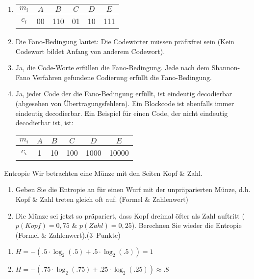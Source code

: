 \documentclass{article}
\begin{document}
\begin{solution}
  \begin{enumerate}
    \item
          \begin{tabular}{c|ccccc}
            $m_i$ & $A$ & $B$ & $C$ & $D$ & $E$ \\
            \hline
            $c_i$ & 00  & 110 & 01  & 10  & 111 \\
          \end{tabular}
    \item Die Fano-Bedingung lautet: Die Codewörter müssen präfixfrei sein (Kein Codewort bildet Anfang von anderem Codewort).
    \item Ja, die Code-Worte erfüllen die Fano-Bedingung. Jede nach dem Shannon-Fano Verfahren gefundene Codierung erfüllt die Fano-Bedingung.
    \item Ja, jeder Code der die Fano-Bedingung erfüllt, ist eindeutig decodierbar (abgesehen von Übertragungsfehlern). Ein Blockcode ist ebenfalls immer eindeutig decodierbar. Ein Beispiel für einen Code, der nicht eindeutig decodierbar ist, ist:\par
          \begin{tabular}{c|ccccc}
            $m_i$ & $A$ & $B$ & $C$ & $D$  & $E$   \\
            \hline
            $c_i$ & 1   & 10  & 100 & 1000 & 10000 \\
          \end{tabular}
  \end{enumerate}
\end{solution}

\begin{exercise}{Entropie}
  Wir betrachten eine Münze mit den Seiten Kopf \& Zahl.
  \begin{enumerate}
    \item Geben Sie die Entropie an für einen Wurf mit der unpräparierten Münze, d.h. Kopf \& Zahl treten gleich oft auf. (Formel \& Zahlenwert)\points[3]
    \item Die Münze sei jetzt so präpariert, dass Kopf dreimal öfter als Zahl auftritt ($p(Kopf) = 0,75$ \& $p(Zahl) = 0,25$). Berechnen Sie wieder die Entropie (Formel \& Zahlenwert).(3~Punkte)
  \end{enumerate}
\end{exercise}

\begin{solution}
  \begin{enumerate}
    \item $H = -(.5\cdot\log_2(.5) + .5\cdot\log_2(.5)) = 1$
    \item $H = -(.75\cdot\log_2(.75) + .25\cdot\log_2(.25)) \approx .8$
  \end{enumerate}
\end{solution}
\end{document}
